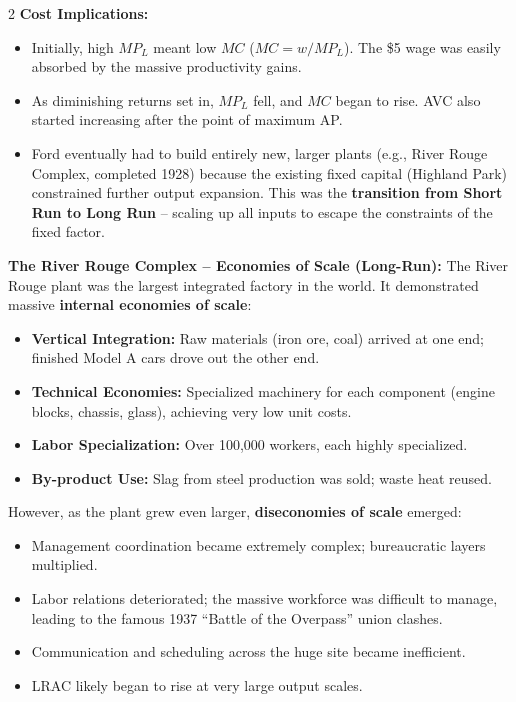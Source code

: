 \documentclass[10pt,a4paper]{article}
\begin{document}
\begin{multicols}{2}
\textbf{Cost Implications:}
\begin{itemize}[leftmargin=*,nosep]
    \item Initially, high $MP_L$ meant low $MC$ ($MC = w/MP_L$). The \$5 wage was easily absorbed by the massive productivity gains.
    \item As diminishing returns set in, $MP_L$ fell, and $MC$ began to rise. AVC also started increasing after the point of maximum AP.
    \item Ford eventually had to build entirely new, larger plants (e.g., River Rouge Complex, completed 1928) because the existing fixed capital (Highland Park) constrained further output expansion. This was the \textbf{transition from Short Run to Long Run} -- scaling up all inputs to escape the constraints of the fixed factor.
\end{itemize}

\textbf{The River Rouge Complex -- Economies of Scale (Long-Run):}
The River Rouge plant was the largest integrated factory in the world. It demonstrated massive \textbf{internal economies of scale}:
\begin{itemize}[leftmargin=*,nosep]
    \item \textbf{Vertical Integration:} Raw materials (iron ore, coal) arrived at one end; finished Model A cars drove out the other end.
    \item \textbf{Technical Economies:} Specialized machinery for each component (engine blocks, chassis, glass), achieving very low unit costs.
    \item \textbf{Labor Specialization:} Over 100,000 workers, each highly specialized.
    \item \textbf{By-product Use:} Slag from steel production was sold; waste heat reused.
\end{itemize}
However, as the plant grew even larger, \textbf{diseconomies of scale} emerged:
\begin{itemize}[leftmargin=*,nosep]
    \item Management coordination became extremely complex; bureaucratic layers multiplied.
    \item Labor relations deteriorated; the massive workforce was difficult to manage, leading to the famous 1937 ``Battle of the Overpass'' union clashes.
    \item Communication and scheduling across the huge site became inefficient.
    \item LRAC likely began to rise at very large output scales.
\end{itemize}


\end{multicols}
\end{document}
